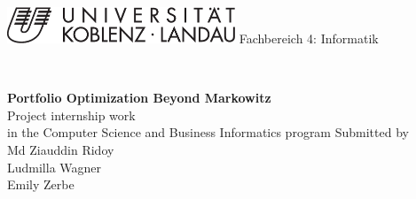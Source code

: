 \begin{titlepage}
\enlargethispage{3em}
\begin{minipage}{0.45\textwidth}
  \begin{flushleft} \small
    \includegraphics[width=68mm]{Uni-Logo}
    \hspace*{16mm}Fachbereich 4: Informatik
  \end{flushleft}
\end{minipage}
\hfill
\begin{minipage}{0.5\textwidth}
  \begin{flushright} \small
    {\ }
  \end{flushright}
\end{minipage}
\vfill
\hspace*{15mm}
\begin{minipage}[b]{0.9\textwidth}
  \begin{flushleft}
\LARGE{\bf Portfolio Optimization Beyond Markowitz} \\
\vspace{7cm}
\Large{
	Project internship work \\
in the Computer Science and Business Informatics program
} %
\vspace{2em}
\small{Submitted by} \\
\vspace{1em}
\Large{
  Md Ziauddin Ridoy \\
  Ludmilla Wagner \\
  Emily Zerbe
}
\vspace{2em}


\end{flushleft}
\end{minipage}
\end{titlepage}
